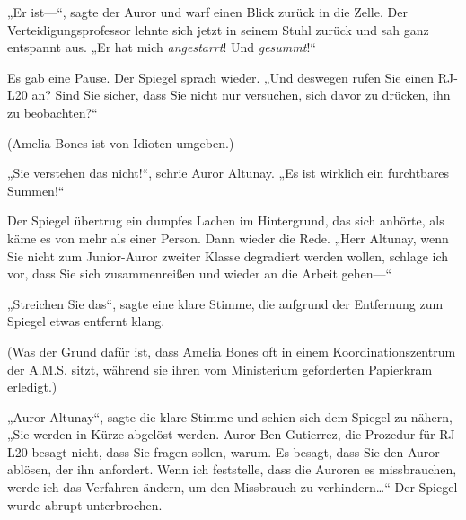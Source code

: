 „Er ist—“, sagte der Auror und warf einen Blick zurück in die Zelle. Der Verteidigungsprofessor lehnte sich jetzt in seinem Stuhl zurück und sah ganz entspannt aus. „Er hat mich \emph{angestarrt}! Und \emph{gesummt}!“


Es gab eine Pause. Der Spiegel sprach wieder.
„Und deswegen rufen Sie einen RJ-L20 an? Sind Sie sicher, dass Sie nicht nur versuchen, sich davor zu drücken, ihn zu beobachten?“

(Amelia Bones ist von Idioten umgeben.)

„Sie verstehen das nicht!“, schrie Auror Altunay. „Es ist wirklich ein furchtbares Summen!“

Der Spiegel übertrug ein dumpfes Lachen im Hintergrund, das sich anhörte, als käme es von mehr als einer Person. Dann wieder die Rede.
„Herr Altunay, wenn Sie nicht zum Junior-Auror zweiter Klasse degradiert werden wollen, schlage ich vor, dass Sie sich zusammenreißen und wieder an die Arbeit gehen—“

„Streichen Sie das“, sagte eine klare Stimme, die aufgrund der Entfernung zum Spiegel etwas entfernt klang.

(Was der Grund dafür ist, dass Amelia Bones oft in einem Koordinationszentrum der A.M.S. sitzt, während sie ihren vom Ministerium geforderten Papierkram erledigt.)

„Auror Altunay“, sagte die klare Stimme und schien sich dem Spiegel zu nähern, „Sie werden in Kürze abgelöst werden. Auror Ben Gutierrez, die Prozedur für RJ-L20 besagt nicht, dass Sie fragen sollen, warum. Es besagt, dass Sie den Auror ablösen, der ihn anfordert. Wenn ich feststelle, dass die Auroren es missbrauchen, werde ich das Verfahren ändern, um den Missbrauch zu verhindern…“
Der Spiegel wurde abrupt unterbrochen.

